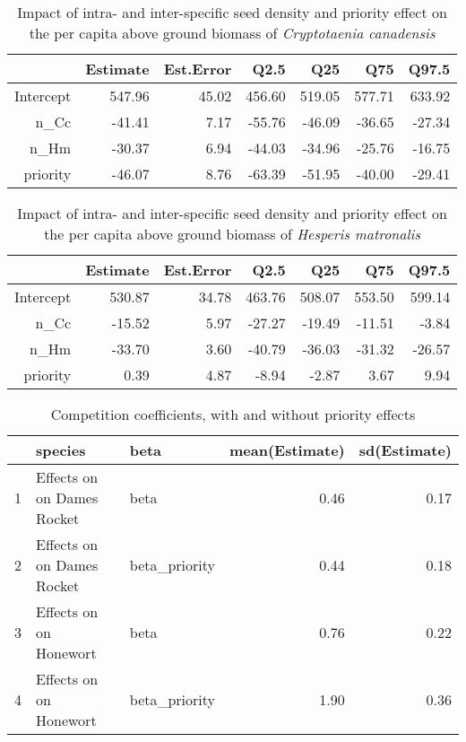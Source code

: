 \documentclass{article}\usepackage[]{graphicx}\usepackage[]{color}
\begin{document}
\begin{table}[ht]
\centering
\begin{tabular}{rrrrrrr}
  \hline
 & Estimate & Est.Error & Q2.5 & Q25 & Q75 & Q97.5 \\ 
  \hline
Intercept & 547.96 & 45.02 & 456.60 & 519.05 & 577.71 & 633.92 \\ 
  n\_Cc & -41.41 & 7.17 & -55.76 & -46.09 & -36.65 & -27.34 \\ 
  n\_Hm & -30.37 & 6.94 & -44.03 & -34.96 & -25.76 & -16.75 \\ 
  priority & -46.07 & 8.76 & -63.39 & -51.95 & -40.00 & -29.41 \\ 
   \hline
\end{tabular}
\caption{Impact of intra- and inter-specific seed density and priority effect on the per capita above ground biomass of \textit{Cryptotaenia canadensis}}
\end{table}

\begin{table}[ht]
\centering
\begin{tabular}{rrrrrrr}
  \hline
 & Estimate & Est.Error & Q2.5 & Q25 & Q75 & Q97.5 \\ 
  \hline
Intercept & 530.87 & 34.78 & 463.76 & 508.07 & 553.50 & 599.14 \\ 
  n\_Cc & -15.52 & 5.97 & -27.27 & -19.49 & -11.51 & -3.84 \\ 
  n\_Hm & -33.70 & 3.60 & -40.79 & -36.03 & -31.32 & -26.57 \\ 
  priority & 0.39 & 4.87 & -8.94 & -2.87 & 3.67 & 9.94 \\ 
   \hline
\end{tabular}
\caption{Impact of intra- and inter-specific seed density and priority effect on the per capita above ground biomass of \textit{Hesperis matronalis}}
\end{table}


\begin{table}[ht]
\centering
\begin{tabular}{rllrr}
  \hline
 & species & beta & mean(Estimate) & sd(Estimate) \\ 
  \hline
1 & Effects on 
on Dames Rocket & beta & 0.46 & 0.17 \\ 
  2 & Effects on 
on Dames Rocket & beta\_priority & 0.44 & 0.18 \\ 
  3 & Effects on 
on Honewort & beta & 0.76 & 0.22 \\ 
  4 & Effects on 
on Honewort & beta\_priority & 1.90 & 0.36 \\ 
   \hline
\end{tabular}
\caption{Competition coefficients, with and without priority effects}
\end{table}
\end{document}

